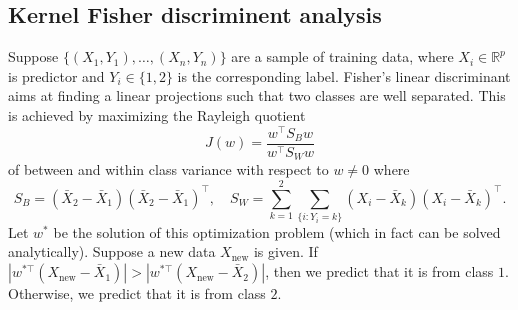 \documentclass[11pt]{article}
\theoremstyle{plain}
\theoremstyle{definition}
\theoremstyle{remark}
\begin{document}
\subsection{Kernel Fisher discriminent analysis}
Suppose $\{(X_{1},Y_1),\ldots, (X_{n},Y_n)\}$ are a sample of training data, where $X_{i}\in \mathbb R^p$ is predictor and $Y_i \in \{1,2\}$ is the corresponding label.
Fisher's linear discriminant aims at finding a linear projections such that two classes are well separated.
This is achieved by maximizing the Rayleigh quotient
\begin{equation*}
    J(w)= \frac{w^\top S_{B} w}{w^\top S_{W} w}
\end{equation*}
of between and within class variance with respect to $w\neq 0$ where
\begin{equation*}
    S_{B}= (\bar X_2 -\bar X_1) (\bar X_2 -\bar X_1)^\top
    ,
    \quad
    S_{W}= \sum_{k=1}^2 \sum_{\{i: Y_i=k\}}(X_{i} -\bar X_k) ( X_{i} -\bar X_k)^\top
    .
\end{equation*}
Let $w^*$ be the solution of this optimization problem (which in fact can be solved analytically).
Suppose a new data $X_{\text{new}}$ is given.
If $|w^{*\top} (X_{\text{new}}-\bar X_{\text{1}})|>|w^{*\top} (X_{\text{new}}-\bar X_{\text{2}})|$, then we predict that it is from class $1$. Otherwise, we predict that it is from class $2$.
\end{document}
